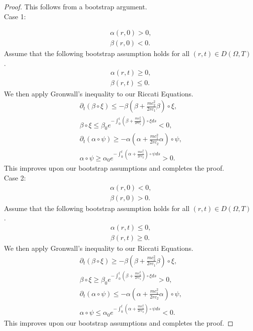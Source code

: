 \documentclass[11pt]{article}
\begin{document}
\begin{proof}
This follows from a bootstrap argument. 
\\
Case 1: 

\begin{align}
	&\alpha(r,0) > 0, 
	\\
	&\beta(r,0) < 0.
\end{align} 
Assume that the following bootstrap assumption holds for all $(r, t) \in D(\Omega,T)$. 
\begin{align}
	&\alpha(r,t) \geq 0, 
	\\
	&\beta(r,t) \leq 0.
\end{align} 
We then apply Gronwall's inequality to our Riccati Equations. 
\begin{align}
	&\partial_t(\beta\circ\xi) \leq -\beta\left(\beta + \frac{mc_2^2}{2rc_1}\beta\right) \circ\xi, 
	\\
	&\beta\circ\xi \leq \beta_0 e^{-\int_0^t \left( \beta + \frac{mc_2^2}{2rc_1} \right)\circ\xi ds} < 0, 
	\\
	&\partial_t(\alpha\circ\psi) \geq -\alpha\left(\alpha + \frac{mc_1^2}{2rc_2}\alpha\right) \circ\psi, 
	\\
	&\alpha\circ\psi \geq \alpha_0 e^{-\int_0^t \left( \alpha + \frac{mc_1^2}{2rc_2} \right)\circ\psi ds} > 0. 
\end{align} 
This improves upon our bootstrap assumptions and completes the proof. 
\bigskip
\\
Case 2: 
\begin{align}
	&\alpha(r,0) < 0, 
	\\
	&\beta(r,0) > 0.
\end{align} 
Assume that the following bootstrap assumption holds for all $(r, t) \in D(\Omega,T)$. 
\begin{align}
	&\alpha(r,t) \leq 0, 
	\\
	&\beta(r,t) \geq 0.
\end{align} 
We then apply Gronwall's inequality to our Riccati Equations. 
\begin{align}
	&\partial_t(\beta\circ\xi) \geq -\beta\left(\beta + \frac{mc_2^2}{2rc_1}\beta\right) \circ\xi, 
	\\
	&\beta\circ\xi \geq \beta_0 e^{-\int_0^t \left( \beta + \frac{mc_2^2}{2rc_1} \right)\circ\xi ds} > 0, 
	\\
	&\partial_t(\alpha\circ\psi) \leq -\alpha\left(\alpha + \frac{mc_1^2}{2rc_2}\alpha\right) \circ\psi, 
	\\
	&\alpha\circ\psi \leq \alpha_0 e^{-\int_0^t \left( \alpha + \frac{mc_1^2}{2rc_2} \right)\circ\psi ds} < 0. 
\end{align} 
This improves upon our bootstrap assumptions and completes the proof. 
\end{proof} 
\end{document}
